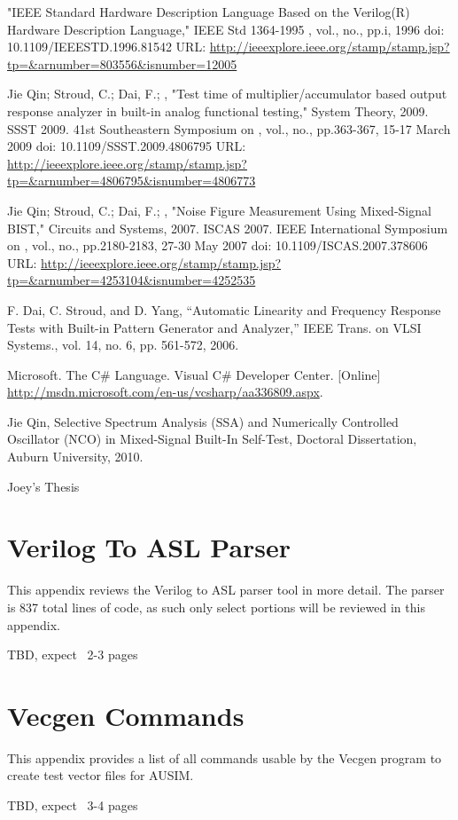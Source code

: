 \documentclass[12pt]{report}
\begin{document}
\begin{thebibliography}{99}
 "IEEE Standard Hardware Description Language Based on the Verilog(R) Hardware Description Language," IEEE Std 1364-1995 , vol., no., pp.i, 1996 doi: 10.1109/IEEESTD.1996.81542 URL: \url{http://ieeexplore.ieee.org/stamp/stamp.jsp?tp=&arnumber=803556&isnumber=12005}

 Jie Qin; Stroud, C.; Dai, F.; , "Test time of multiplier/accumulator based output response analyzer in built-in analog functional testing," System Theory, 2009. SSST 2009. 41st Southeastern Symposium on , vol., no., pp.363-367, 15-17 March 2009 doi: 10.1109/SSST.2009.4806795 URL: \url{http://ieeexplore.ieee.org/stamp/stamp.jsp?tp=&arnumber=4806795&isnumber=4806773}

 Jie Qin; Stroud, C.; Dai, F.; , "Noise Figure Measurement Using Mixed-Signal BIST," Circuits and Systems, 2007. ISCAS 2007. IEEE International Symposium on , vol., no., pp.2180-2183, 27-30 May 2007 doi: 10.1109/ISCAS.2007.378606 URL: \url{http://ieeexplore.ieee.org/stamp/stamp.jsp?tp=&arnumber=4253104&isnumber=4252535}

 F. Dai, C. Stroud, and D. Yang, “Automatic Linearity and Frequency Response Tests with Built-in Pattern Generator and Analyzer,”  IEEE Trans. on VLSI Systems., vol. 14, no. 6, pp. 561-572, 2006.

 Microsoft. The C\# Language. Visual C\# Developer Center. [Online] \url{http://msdn.microsoft.com/en-us/vcsharp/aa336809.aspx}.

 Jie Qin, Selective Spectrum Analysis (SSA) and Numerically Controlled Oscillator (NCO) in Mixed-Signal Built-In Self-Test, Doctoral Dissertation, Auburn University, 2010.

 Joey's Thesis

\label{Bibliography}
\end{thebibliography}

\appendix
{}

\chapter{Verilog To ASL Parser}
\label{apdx:VerilogToASL}
This appendix reviews the Verilog to ASL parser tool in more detail.  The parser is 837 total lines of code, as such only select portions will be reviewed in this appendix.  

TBD, expect ~2-3 pages

\chapter{Vecgen Commands}
\label{apdx:Vecgen}
This appendix provides a list of all commands usable by the Vecgen program to create test vector files for AUSIM.

TBD, expect ~3-4 pages
\end{document}
